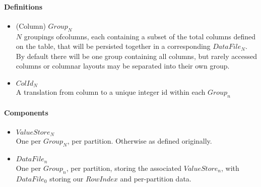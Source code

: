 \documentclass[fleqn]{article}
\begin{document}
\paragraph{Definitions}
\begin{itemize}
  \item (Column) $Group_N$\\[2pt]
    $N$ groupings ofcolumns, each containing a subset of the total columns defined on the table, 
    that will be persisted together in a corresponding $DataFile_N$. By default there will be one 
    group containing all columns, but rarely accessed columns or columnar layouts may be separated 
    into their own group.
  \item $ColId_N$\\[2pt]
    A translation from column to a unique integer id within each $Group_n$
\end{itemize}

\paragraph{Components}
\begin{itemize}
  \item $ValueStore_N$\\[2pt]
    One per $Group_N$, per partition. Otherwise as defined originally.
  \item $DataFile_n$\\[2pt]
    One per $Group_n$, per partition, storing the associated $ValueStore_n$, with $DataFile_0$ 
    storing our $RowIndex$ and per-partition data.
\end{itemize}
\end{document}

